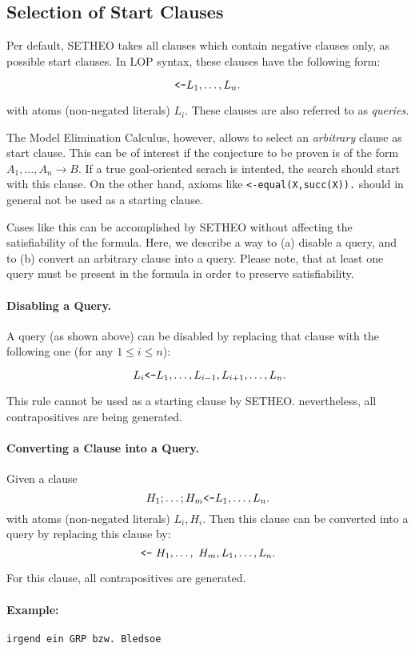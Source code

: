 \subsection{Selection of Start Clauses}

Per default, SETHEO takes all clauses which contain negative
clauses only, as possible start clauses.
In LOP syntax, these clauses have the following form:

\[ \mbox{\tt <-} L_1, \ldots, L_n. \]

with atoms (non-negated literals) $L_i$.
These clauses are also referred to as {\em queries}.

The Model Elimination Calculus, however, allows to select
an {\em arbitrary\/} clause as start clause.
This can be of interest if the conjecture to be proven is of the form
$A_1,\ldots,A_n \rightarrow B$. If a true goal-oriented serach is intented,
the search should start with this clause.
On the other hand, axioms like {\tt <-equal(X,succ(X)).} should in general
not be used as a starting clause.

Cases like this can be accomplished by SETHEO without affecting
the satisfiability of the formula.
Here, we describe a way to (a) disable a query, and to
(b) convert an arbitrary clause into a query.
Please note, that at least one query must be present in the formula in order
to preserve satisfiability.

\paragraph{Disabling a Query.}
A query (as shown above) can be disabled by replacing that clause
with the following one (for any $1 \leq i \leq n$):

\[ {\tt ~}L_i \mbox{\tt <-} L_1, \ldots, L_{i-1},L_{i+1},\ldots,L_n. \]

This rule cannot be used as a starting clause by SETHEO. nevertheless,
all contrapositives are being generated.

\paragraph{Converting a Clause into a Query.}
Given a clause
\[ H_1 ; \ldots ; H_m \mbox{\tt <-} L_1, \ldots,L_n. \]
with atoms (non-negated literals) $L_i,H_i$.
Then this clause can be converted into a query by replacing this
clause by:
\[ \mbox{\tt <-}
{\tt ~}H_1, \ldots ,{\tt ~}H_m, L_1, \ldots,L_n. \]

For this clause, all contrapositives are generated.


\paragraph{Example:}

{\tt irgend ein GRP bzw. Bledsoe}
